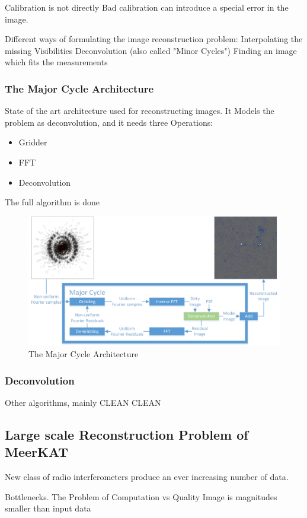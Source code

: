 Calibration is not directly
Bad calibration can introduce a special error in the image.

Different ways of formulating the image reconstruction problem:
Interpolating the missing Visibilities
Deconvolution (also called "Minor Cycles")
Finding an image which fits the measurements

\subsubsection{The Major Cycle Architecture}
State of the art architecture used for reconstructing images. It Models the problem as deconvolution, and it needs three Operations:
\begin{itemize}
	\item Gridder
	\item FFT
	\item Deconvolution
\end{itemize}

The full algorithm is done 

\begin{figure}[h]
	\centering
	\includegraphics[width=0.80\linewidth]{./chapters/02.hypo/Major-Minor3.png}
	\caption{The Major Cycle Architecture}
	\label{intro:major}
\end{figure}

\subsubsection{ Deconvolution}
Other algorithms, mainly CLEAN
CLEAN




\subsection{Large scale Reconstruction Problem of MeerKAT}
New class of radio interferometers produce an ever increasing number of data.


Bottlenecks.
The Problem of Computation vs Quality
Image is magnitudes smaller than input data


